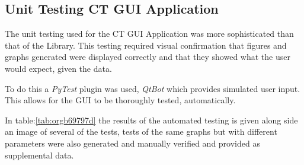 \documentclass[11pt]{report}
\begin{document}
\clearpage

\subsection{Unit Testing CT GUI Application}
\label{sec:orgba0e944}
The unit testing used for the CT GUI Application was more sophisticated than that of the Library. This testing required visual confirmation that figures and graphs generated were displayed correctly and that they showed what the user would expect, given the data.

To do this a \emph{PyTest} plugin was used, \emph{QtBot} which provides simulated user input. This allows for the GUI to be thoroughly tested, automatically.

In table:\ref{tab:orgb69797d} the results of the automated testing is given along side an image of several of the tests, tests of the same graphs but with different parameters were also generated and manually verified and provided as supplemental data.
\end{document}
